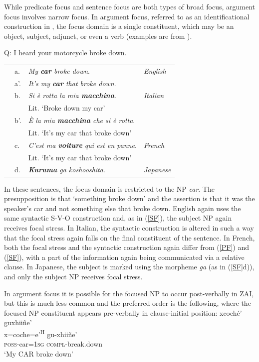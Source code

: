 While predicate focus and sentence focus are both types of broad focus, argument focus involves narrow focus. In argument focus, referred to as an identificational construction in , the focus domain is a single constituent, which may be an object, subject, adjunct, or even a verb (examples are from \citet{lambrecht1994}).


\ea\label{AF}
{Q: I heard your motorcycle broke down.} \\
\begin{table}[H] 
\begin{tabular}{l l l l}
 & a. & \textit{My \textbf{car} broke down}. & \textit{English} \\
 & a'. & \textit{It's my \textbf{car} that broke down}. \\
 & b. & \textit{Si \`{e} rotta la mia \textbf{macchina}}. & \textit{Italian} \\
  & & Lit. `Broke down my car' \\
   & b'. & \textit{\`{E} la mia \textbf{macchina} che si \`{e} rotta}. \\
     & & Lit. `It's my car that broke down' \\
 & c. & \textit{C'est ma \textbf{voiture} qui est en panne}. & \textit{French} \\
  & & Lit. `It's my car that broke down'  \\
   & d. & \textit{\textbf{Kuruma} ga koshooshita}.  & \textit{Japanese} \\
\end{tabular}
\end{table}
\z

In these sentences, the focus domain is restricted to the NP \textit{car}. The presupposition is that `something broke down' and the assertion is that it was the speaker's car and not something else that broke down. English again uses the same syntactic S-V-O construction and, as in (\ref{SF}), the subject NP again receives focal stress. In Italian, the syntactic construction is altered in such a way that the focal stress again falls on the final constituent of the sentence. In French, both the focal stress and the syntactic construction again differ from (\ref{PF}) and (\ref{SF}), with a part of the information again being communicated via a relative clause. In Japanese, the subject is marked using the morpheme \textit{ga} (as in (\ref{SF}d)), and only the subject NP receives focal stress.

In argument focus it is possible for the focused NP to occur post-verbally in ZAI, but this is much less common and the preferred order is the following, where the focused NP constituent appears pre-verbally in clause-initial position: 
\ea 
\glll xcoch\'{e}' guxhii\~{n}e' \\
x=coche=e'\textsuperscript{H} gu-xhii\~{n}e'  \\
\textsc{poss}-car=\textsc{1sg} \textsc{compl}-break.down  \\
\glt `My CAR broke down'
\z

